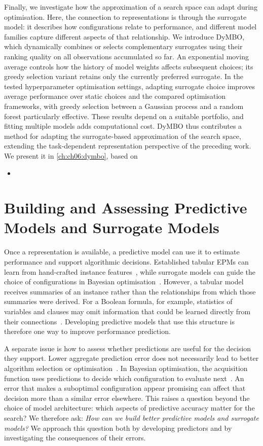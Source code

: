 Finally, we investigate how the approximation of a search space can adapt during optimisation. Here, the connection to representations is through the surrogate model: it describes how configurations relate to performance, and different model families capture different aspects of that relationship. We introduce DyMBO, which dynamically combines or selects complementary surrogates using their ranking quality on all observations accumulated so far. An exponential moving average controls how the history of model weights affects subsequent choices; its greedy selection variant retains only the currently preferred surrogate. In the tested hyperparameter optimisation settings, adapting surrogate choice improves average performance over static choices and the compared optimisation frameworks, with greedy selection between a Gaussian process and a random forest particularly effective. These results depend on a suitable portfolio, and fitting multiple models adds computational cost. DyMBO thus contributes a method for adapting the surrogate-based approximation of the search space, extending the task-dependent representation perspective of the preceding work. We present it in \cref{ch:ch06:dymbo}, based on
\begin{itemize}
    \item {}
\end{itemize}

\section{Building and Assessing Predictive Models and Surrogate Models}

Once a representation is available, a predictive model can use it to estimate performance and support algorithmic decisions. Established tabular EPMs can learn from hand-crafted instance features~\citep{HutEtAl14}, while surrogate models can guide the choice of configurations in Bayesian optimisation~\citep{Garnett23}. However, a tabular model receives summaries of an instance rather than the relationships from which those summaries were derived. For a Boolean formula, for example, statistics of variables and clauses may omit information that could be learned directly from their connections~\citep{SelEtAl19}. Developing predictive models that use this structure is therefore one way to improve performance prediction.

A separate issue is how to assess whether predictions are useful for the decision they support. Lower aggregate prediction error does not necessarily lead to better algorithm selection or optimisation~\citep{XuEtAl12b,ShaHoo25}. In Bayesian optimisation, the acquisition function uses predictions to decide which configuration to evaluate next~\citep{Garnett23}. An error that makes a suboptimal configuration appear promising can affect that decision more than a similar error elsewhere. This raises a question beyond the choice of model architecture: which aspects of predictive accuracy matter for the search? We therefore ask: \emph{How can we build better predictive models and surrogate models?} We approach this question both by developing predictors and by investigating the consequences of their errors.

